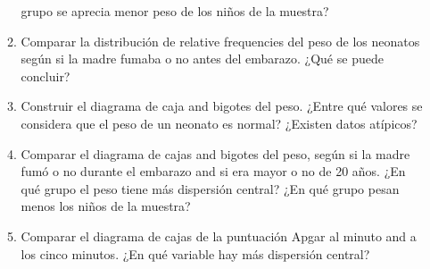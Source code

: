 \begin{enumerate}[leftmargin=*]
\begin{enumerate}
grupo se aprecia menor peso de los niños de la muestra?
\item Comparar la distribución de relative frequencies del peso de los neonatos según si la madre fumaba o no antes del
embarazo. ¿Qué se puede concluir?
\item Construir el diagrama de caja and bigotes del peso. ¿Entre qué valores se considera que el peso de un neonato es
normal? ¿Existen datos atípicos?
\item Comparar el diagrama de cajas and bigotes del peso, según si la madre fumó o no durante el embarazo and si era mayor o
no de 20 años. ¿En qué grupo el peso tiene más dispersión central? ¿En qué grupo pesan menos los niños de la
muestra?
\item Comparar el diagrama de cajas de la puntuación Apgar al minuto and a los cinco minutos. ¿En qué variable hay más
dispersión central?
\end{enumerate}  

\end{enumerate}
